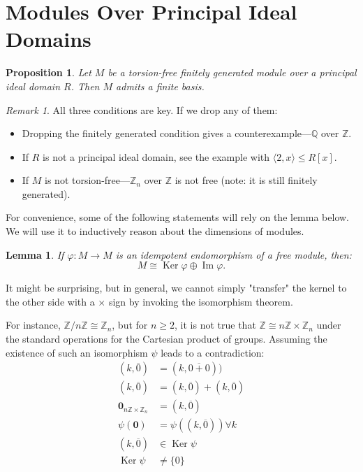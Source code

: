 \documentclass{article}
\newif\ifusemulticols
\theoremstyle{definition}
\theoremstyle{remark}
\newtheorem*{note}{Remark}
\theoremstyle{plain}
\theoremstyle{plain}
\newtheorem{prop}[theorem]{Proposition}
\newtheorem{lemma}[theorem]{Lemma}
\newenvironment{mymulticols}
    { \ifusemulticols \begin{multicols}{2} \fi }
    { \ifusemulticols \end{multicols} \fi }
\DeclareMathOperator{\Ker}{Ker}
\DeclareMathOperator{\image}{Im}
\newcommand{\Z}{\mathbb{Z}}
\begin{document}
\begin{mymulticols}
\section{Modules Over Principal Ideal Domains}

\begin{prop}
    Let $M$ be a torsion-free finitely generated module over a principal ideal domain $R$. Then $M$
    admits a finite basis.
\end{prop}

\begin{note}
    All three conditions are key. If we drop any of them:
    \begin{itemize}
        \item Dropping the finitely generated condition gives a counterexample—$\mathbb{Q}$ over $\Z$.
        \item If $R$ is not a principal ideal domain, see the example with $\langle 2, x \rangle \le R[x]$.
        \item If $M$ is not torsion-free—$\Z_n$ over $\Z$ is not free (note: it is still finitely generated).
    \end{itemize}
\end{note}

For convenience, some of the following statements will rely on the lemma below. We will use it to inductively reason about the dimensions of modules.

\begin{lemma}
    \label{prop:idemp_endo_iso}
    If $\varphi : M \to M$ is an idempotent endomorphism of a free module, then:
    $$M \cong \Ker \varphi \oplus \image \varphi.$$
\end{lemma}
It might be surprising, but in general, we cannot simply "transfer" the kernel to the other side
with a $\times$ sign by invoking the isomorphism theorem.

For instance, $\Z / n\Z \cong \Z_n$, but for $n \ge 2$, it is not true that $\Z \cong n\Z \times \Z_n$
under the standard operations for the Cartesian product of groups.
Assuming the existence of such an isomorphism $\psi$ leads to a contradiction:
\begin{align*}
    (k,\overline 0) &= (k, \overline{0+0}))\\
    (k, \overline 0) &= (k, \overline 0) + (k, \overline 0)\\
    \boldsymbol{0}_{n\Z \times \Z_n} &= (k, \overline 0)\\
    \psi(\boldsymbol 0)&= \psi((k, \overline 0))\forall k\\
    (k, \overline 0) &\in \Ker \psi\\
    \Ker \psi &\not= \{0\}
\end{align*}


\end{mymulticols}
\end{document}
